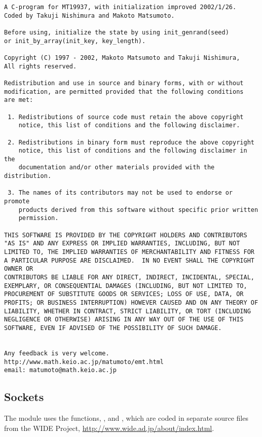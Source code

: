 \begin{verbatim}
A C-program for MT19937, with initialization improved 2002/1/26.
Coded by Takuji Nishimura and Makoto Matsumoto.

Before using, initialize the state by using init_genrand(seed)
or init_by_array(init_key, key_length).

Copyright (C) 1997 - 2002, Makoto Matsumoto and Takuji Nishimura,
All rights reserved.

Redistribution and use in source and binary forms, with or without
modification, are permitted provided that the following conditions
are met:

 1. Redistributions of source code must retain the above copyright
    notice, this list of conditions and the following disclaimer.

 2. Redistributions in binary form must reproduce the above copyright
    notice, this list of conditions and the following disclaimer in the
    documentation and/or other materials provided with the distribution.

 3. The names of its contributors may not be used to endorse or promote
    products derived from this software without specific prior written
    permission.

THIS SOFTWARE IS PROVIDED BY THE COPYRIGHT HOLDERS AND CONTRIBUTORS
"AS IS" AND ANY EXPRESS OR IMPLIED WARRANTIES, INCLUDING, BUT NOT
LIMITED TO, THE IMPLIED WARRANTIES OF MERCHANTABILITY AND FITNESS FOR
A PARTICULAR PURPOSE ARE DISCLAIMED.  IN NO EVENT SHALL THE COPYRIGHT OWNER OR
CONTRIBUTORS BE LIABLE FOR ANY DIRECT, INDIRECT, INCIDENTAL, SPECIAL,
EXEMPLARY, OR CONSEQUENTIAL DAMAGES (INCLUDING, BUT NOT LIMITED TO,
PROCUREMENT OF SUBSTITUTE GOODS OR SERVICES; LOSS OF USE, DATA, OR
PROFITS; OR BUSINESS INTERRUPTION) HOWEVER CAUSED AND ON ANY THEORY OF
LIABILITY, WHETHER IN CONTRACT, STRICT LIABILITY, OR TORT (INCLUDING
NEGLIGENCE OR OTHERWISE) ARISING IN ANY WAY OUT OF THE USE OF THIS
SOFTWARE, EVEN IF ADVISED OF THE POSSIBILITY OF SUCH DAMAGE.


Any feedback is very welcome.
http://www.math.keio.ac.jp/matumoto/emt.html
email: matumoto@math.keio.ac.jp
\end{verbatim}



\subsection{Sockets}

The  module uses the functions, ,
and , which are coded in separate source files
from the WIDE Project, \url{http://www.wide.ad.jp/about/index.html}.


